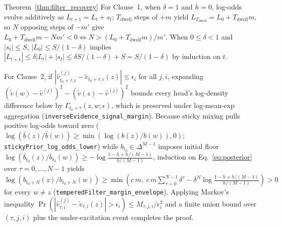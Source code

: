 \begin{proofof}{Theorem~\ref{thm:filter_recovery}}
For Clause~1, when $\delta=1$ and $h=0$, log-odds evolve additively as $L_{t+1}=L_t+s_t$; $T_{\mathrm{dwell}}$ steps of $+m$ yield $L_{T_{\mathrm{dwell}}}=L_0+T_{\mathrm{dwell}}m$, so $N$ opposing steps of $-m'$ give $L_0+T_{\mathrm{dwell}}m-Nm'<0\iff N>(L_0+T_{\mathrm{dwell}}m)/m'$. When $0\le\delta<1$ and $|s_t|\le S$, $|L_0|\le S/(1-\delta)$ implies $|L_{t+1}|\le \delta|L_t|+|s_t|\le \delta S/(1-\delta)+S=S/(1-\delta)$ by induction on $t$.

For Clause~2, if $|\hat v_{t_0+\tau,i}^{(j)}-\tilde v_{t_0+\tau,i}(z)|\le \epsilon_i$ for all $j,i$, expanding $(\tilde v(w)-\hat v^{(j)})^2-(\tilde v(z)-\hat v^{(j)})^2$ bounds every head's log-density difference below by $\Gamma_{t_0+\tau}(z,w;\epsilon)$, which is preserved under log-mean-exp aggregation (\texttt{inverseEvidence\_signal\_margin}). Because sticky mixing pulls positive log-odds toward zero ($\log(\bar b(z)/\bar b(w))\ge \min(\log(b(z)/b(w)),0)$; \texttt{stickyPrior\_\allowbreak log\_\allowbreak odds\_\allowbreak lower}) while $b_{t_0}\in\Delta^{M-1}$ imposes initial floor $\log(\bar b_{t_0}(z)/\bar b_{t_0}(w))\ge -\log\frac{1-h+h/(M-1)}{h/(M-1)}$, induction on Eq.~\eqref{eq:posterior} over $\tau=0,\ldots,N-1$ yields $\log(b_{t_0+N}(z)/b_{t_0+N}(w))\ge \min\!\left(c\,m,\;c\,m\sum_{\tau=0}^{N-1}\delta^\tau-\delta^N\log\frac{1-h+h/(M-1)}{h/(M-1)}\right)>0$ for every $w\ne z$ (\texttt{temperedFilter\_\allowbreak margin\_\allowbreak envelope}). Applying Markov's inequality $\Pr(|\hat v_{\tau,i}^{(j)}-\tilde v_{\tau,i}(z)|>\epsilon_i)\le M_{\tau,j,i}/\epsilon_i^2$ and a finite union bound over $(\tau,j,i)$ plus the under-excitation event completes the proof.
\end{proofof}

